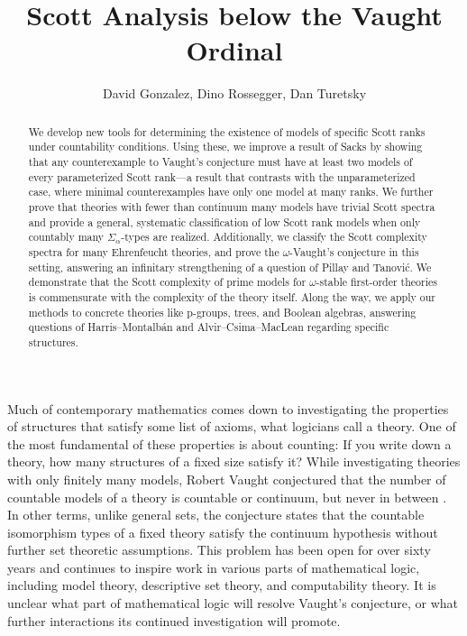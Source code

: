 \documentclass{amsart}
\title{Scott Analysis below the Vaught Ordinal}
\author{David Gonzalez, Dino Rossegger, Dan Turetsky}
\renewcommand{\-}{\text{-}}
\begin{document}
\begin{abstract}
We develop new tools for determining the existence of models of specific Scott ranks under countability conditions. Using these, we improve a result of Sacks by showing that any counterexample to Vaught’s conjecture must have at least two models of every parameterized Scott rank—a result that contrasts with the unparameterized case, where minimal counterexamples have only one model at many ranks. We further prove that theories with fewer than continuum many models have trivial Scott spectra and provide a general, systematic classification of low Scott rank models when only countably many $\Sigma_\alpha$-types are realized. Additionally, we classify the Scott complexity spectra for many Ehrenfeucht theories, and prove the $\omega$-Vaught’s conjecture in this setting, answering an infinitary strengthening of a question of Pillay and Tanovi\'{c}. We demonstrate that the Scott complexity of prime models for $\omega$-stable first-order theories is commensurate with the complexity of the theory itself. Along the way, we apply our methods to concrete theories like p-groups, trees, and Boolean algebras, answering questions of Harris--Montalbán and Alvir--Csima--MacLean regarding specific structures.
\end{abstract}
\maketitle
Much of contemporary mathematics comes down to investigating the properties of structures that satisfy some list of axioms, what logicians call a theory.
One of the most fundamental of these properties is about counting:
If you write down a theory, how many structures of a fixed size satisfy it?
While investigating theories with only finitely many models, Robert Vaught conjectured that the number of countable models of a theory is countable or continuum, but never in between \cite{Vau61}.
In other terms, unlike general sets, the conjecture states that the countable isomorphism types of a fixed theory satisfy the continuum hypothesis without further set theoretic assumptions.
This problem has been open for over sixty years and continues to inspire work in various parts of mathematical logic, including model theory, descriptive set theory, and computability theory.
It is unclear what part of mathematical logic will resolve Vaught's conjecture, or what further interactions its continued investigation will promote.
\end{document}
